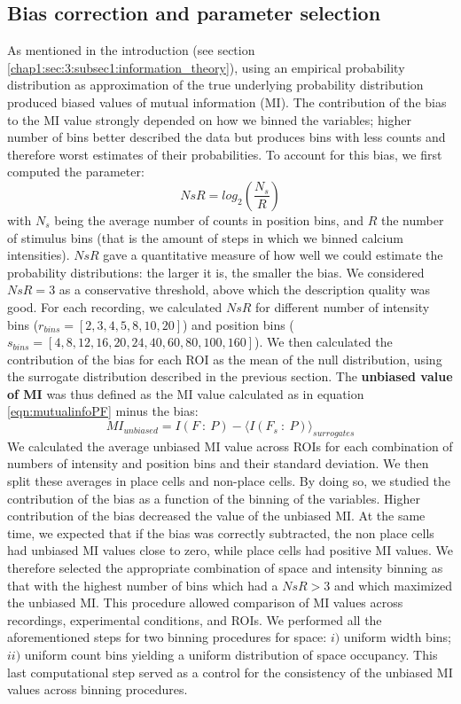 \subsection{Bias correction and parameter selection}
\label{chap3:sec:7:subsec3:bias_correction}
As mentioned in the introduction (see section \ref{chap1:sec:3:subsec1:information_theory}), using an empirical probability distribution as approximation of the true underlying probability distribution produced biased values of mutual information (MI). 
The contribution of the bias to the MI value strongly depended on how we binned the variables; higher number of bins better described the data but produces bins with less counts and therefore worst estimates of their probabilities. 
To account for this bias, we first computed the parameter: 
\begin{equation}
    NsR = log_2(\frac{N_s}{R})
\end{equation}
with $N_s$ being the average number of counts in position bins, and $R$ the number of stimulus bins (that is the amount of steps in which we binned calcium intensities).
$NsR$ gave a quantitative measure of how well we could estimate the probability distributions: the larger it is, the smaller the bias. 
We considered $NsR=3$ as a conservative threshold, above which the description quality was good.
For each recording, we calculated $NsR$ for different number of intensity bins ($r_{bins} = [2,3,4,5,8,10,20]$) and position bins ($s_{bins} = [4,8,12,16,20,24,40,60,80,100,160]$).
We then calculated the contribution of the bias for each ROI as the mean of the null distribution, using the surrogate distribution described in the previous section. 
The \textbf{unbiased value of MI} was thus defined as the MI value calculated as in equation \ref{eqn:mutualinfoPF} minus the bias:
\begin{equation}
    \label{eqn:unbias_mutualinfo}
    MI_{unbiased}=I(F\ :\ P) - \langle I(F_{s}\ :\ P)\rangle_{surrogates}
\end{equation}
We calculated the average unbiased MI value across ROIs for each combination of numbers of intensity and position bins and their standard deviation. We then split these averages in place cells and non-place cells. 
By doing so, we studied the contribution of the bias as a function of the binning of the variables.
Higher contribution of the bias decreased the value of the unbiased MI.
At the same time, we expected that if the bias was correctly subtracted, the non place cells had unbiased MI values close to zero, while place cells had positive MI values. 
We therefore selected the appropriate combination of space and intensity binning as that with the highest number of bins which had a $NsR>3$ and which maximized the unbiased MI. 
This procedure allowed comparison of MI values across recordings, experimental conditions, and ROIs. 
We performed all the aforementioned steps for two binning procedures for space: $i)$ uniform width bins; $ii)$ uniform count bins yielding a uniform distribution of space occupancy.
This last computational step served as a control for the consistency of the unbiased MI values across binning procedures. 
